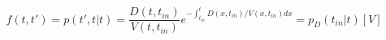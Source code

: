 \begin{equation}
f(t,t') = p(t',t|t)=  \frac{D(t,t_{in})}{V(t,t_{in})}e^{-\int_{t_{in}}^t D(x,t_{in})/V(x,t_{in}) dx} = p_D(t_{in}|t)\left[ V\right]
\end{equation}